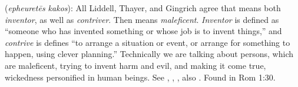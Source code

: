 \item[Maleficent contriver,]

(\textit{epheuretēs kakos}):
All Liddell, Thayer, and Gingrich agree that  means both \emph{inventor}, as well as \emph{contriver}. Then  means \emph{maleficent}. \emph{Inventor} is defined as ``someone who has invented something or whose job is to invent things,'' and \emph{contrive} is defines ``to arrange a situation or event, or arrange for something to happen, using clever planning.'' Technically we are talking about persons, which are maleficent, trying to invent harm and evil, and making it come true, wickedness personified in human beings. 
See , , , also .
Found in Rom 1:30.
